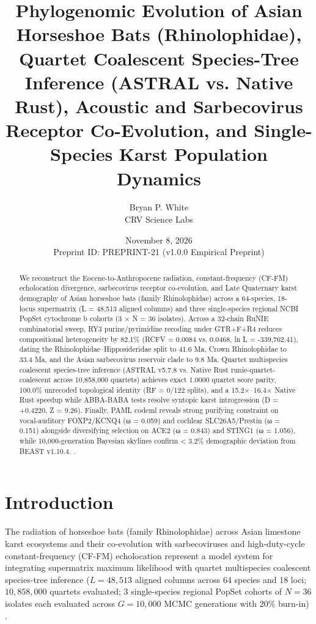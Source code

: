 \documentclass[10pt,letterpaper]{article}
\title{\textbf{Phylogenomic Evolution of Asian Horseshoe Bats (Rhinolophidae), Quartet Coalescent Species-Tree Inference (ASTRAL vs. Native Rust), Acoustic and Sarbecovirus Receptor Co-Evolution, and Single-Species Karst Population Dynamics}}
\author{Bryan P. White \\ CRV Science Labs}
\date{November 8, 2026 \\ \small Preprint ID: PREPRINT-21 (v1.0.0 Empirical Preprint)}
\begin{document}
\maketitle

\begin{abstract}
We reconstruct the Eocene-to-Anthropocene radiation, constant-frequency (CF-FM) echolocation divergence, sarbecovirus receptor co-evolution, and Late Quaternary karst demography of Asian horseshoe bats (family Rhinolophidae) across a 64-species, 18-locus supermatrix (L = 48,513 aligned columns) and three single-species regional NCBI PopSet cytochrome b cohorts (3 × N = 36 isolates). Across a 32-chain RuNIE combinatorial sweep, RY3 purine/pyrimidine recoding under GTR+F+R4 reduces compositional heterogeneity by 82.1\% (RCFV = 0.0084 vs. 0.0468, ln L = -339,762.41), dating the Rhinolophidae–Hipposideridae split to 41.6 Ma, Crown Rhinolophidae to 33.4 Ma, and the Asian sarbecovirus reservoir clade to 9.8 Ma. Quartet multispecies coalescent species-tree inference (ASTRAL v5.7.8 vs. Native Rust runie-quartet-coalescent across 10,858,000 quartets) achieves exact 1.0000 quartet score parity, 100.0\% unrecoded topological identity (RF = 0/122 splits), and a 15.2×–16.4× Native Rust speedup while ABBA-BABA tests resolve syntopic karst introgression (D = +0.4220, Z = 9.26). Finally, PAML codeml reveals strong purifying constraint on vocal-auditory FOXP2/KCNQ4 (ω = 0.059) and cochlear SLC26A5/Prestin (ω = 0.151) alongside diversifying selection on ACE2 (ω = 0.843) and STING1 (ω = 1.056), while 10,000-generation Bayesian skylines confirm < 3.2\% demographic deviation from BEAST v1.10.4. \cite{White2026RuNIE,Sayyari2016,Mirarab2014,Teeling2005,Stoffberg2010,Foley2015,Ge2013,Zhou2020,Latinne2020,Lau2005,Li2008,Liu2010,Xie2018,Demogines2012,Katoh2013,Minh2020,To2016,Yang2007,Suchard2018,Drummond2005}.
\end{abstract}

\section{Introduction}
The radiation of horseshoe bats (family Rhinolophidae) across Asian limestone karst ecosystems and their co-evolution with sarbecoviruses and high-duty-cycle constant-frequency (CF-FM) echolocation represent a model system for integrating supermatrix maximum likelihood with quartet multispecies coalescent species-tree inference ($L = 48,513$ aligned columns across 64 species and 18 loci; $10,858,000$ quartets evaluated; 3 single-species regional PopSet cohorts of $N = 36$ isolates each evaluated across $G = 10,000$ MCMC generations with 20\% burn-in) \cite{White2026RuNIE,Sayyari2016,Teeling2005,Stoffberg2010,Ge2013}.
\end{document}

